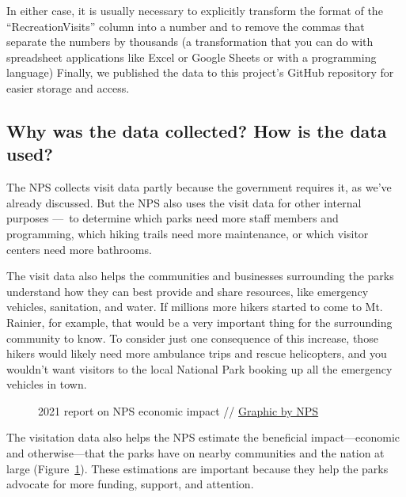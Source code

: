 \documentclass[
  letterpaper,
  DIV=11,
  numbers=noendperiod]{scrartcl}
\begin{document}
In either case, it is usually necessary to explicitly transform the
format of the ``RecreationVisits'' column into a number and to remove
the commas that separate the numbers by thousands (a transformation that
you can do with spreadsheet applications like Excel or Google Sheets or
with a programming language) Finally, we published the data to this
project's GitHub repository for easier storage and access.

\subsection{Why was the data collected? How is the data
used?}\label{why-was-the-data-collected-how-is-the-data-used}

The NPS collects visit data partly because the government requires it,
as we've already discussed. But the NPS also uses the visit data for
other internal purposes ---~to determine which parks need more staff
members and programming, which hiking trails need more maintenance, or
which visitor centers need more bathrooms.

The visit data also helps the communities and businesses surrounding the
parks understand how they can best provide and share resources, like
emergency vehicles, sanitation, and water. If millions more hikers
started to come to Mt. Rainier, for example, that would be a very
important thing for the surrounding community to know. To consider just
one consequence of this increase, those hikers would likely need more
ambulance trips and rescue helicopters, and you wouldn't want visitors
to the local National Park booking up all the emergency vehicles in
town.

\begin{figure}


\caption{\label{fig-economic-benefit}2021 report on NPS economic impact
// \href{https://www.nps.gov/orgs/1207/vse2020.htm}{Graphic by NPS}}

\end{figure}%

The visitation data also helps the NPS estimate the beneficial
impact---economic and otherwise---that the parks have on nearby
communities and the nation at large (Figure~\ref{fig-economic-benefit}).
These estimations are important because they help the parks advocate for
more funding, support, and attention.
\end{document}
